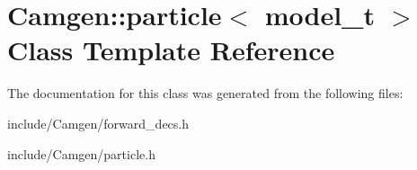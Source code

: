 \hypertarget{a00400}{}\section{Camgen\+:\+:particle$<$ model\+\_\+t $>$ Class Template Reference}
\label{a00400}


The documentation for this class was generated from the following files\+:\begin{DoxyCompactItemize}
\item 
include/\+Camgen/forward\+\_\+decs.\+h\item 
include/\+Camgen/particle.\+h\end{DoxyCompactItemize}
